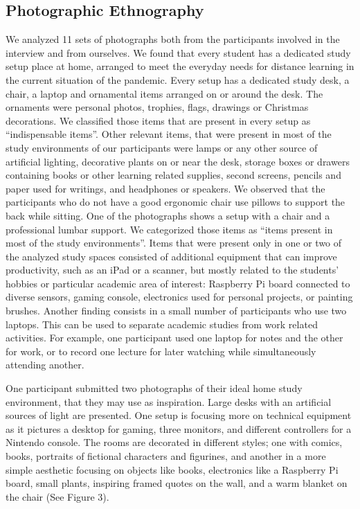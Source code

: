 \documentclass{sigchi}
\begin{document}
\subsection{Photographic Ethnography}
We analyzed 11 sets of photographs both from the participants involved in the interview and from ourselves. We found that every student has a dedicated study setup place at home, arranged to meet the everyday needs for distance learning in the current situation of the pandemic. Every setup has a dedicated study desk, a chair, a laptop and ornamental items arranged on or around the desk. The ornaments were personal photos, trophies, flags, drawings or Christmas decorations. We classified those items that are present in every setup as “indispensable items”. Other relevant items, that were present in most of the study environments of our participants were lamps or any other source of artificial lighting, decorative plants on or near the desk, storage boxes or drawers containing books or other learning related supplies, second screens, pencils and paper used for writings, and headphones or speakers. We observed that the participants who do not have a good ergonomic chair use pillows to support the back while sitting. One of the photographs shows a setup with a chair and a professional lumbar support. We categorized those items as “items present in most of the study environments”. Items that were present only in one or two of the analyzed study spaces consisted of additional equipment that can improve productivity, such as an iPad or a scanner, but mostly related to the students' hobbies or particular academic area of interest: Raspberry Pi board connected to diverse sensors, gaming console, electronics used for personal projects, or painting brushes. Another finding consists in a small number of participants who use two laptops. This can be used to separate academic studies from work related activities. For example, one participant used one laptop for notes and the other for work, or to record one lecture for later watching while simultaneously attending another.

One participant submitted two photographs of their ideal home study environment, that they may use as inspiration. Large desks with an artificial sources of light are presented. One setup is focusing more on technical equipment as it pictures a desktop for gaming, three monitors, and different controllers for a Nintendo console. The rooms are decorated in different styles; one with comics, books, portraits of fictional characters and figurines, and another in a more simple aesthetic focusing on objects like books, electronics like a Raspberry Pi board, small plants, inspiring framed quotes on the wall, and a warm blanket on the chair (See Figure 3). 
\end{document}
